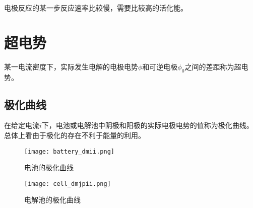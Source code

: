 电极反应的某一步反应速率比较慢，需要比较高的活化能。


\section{超电势}


某一电流密度下，实际发生电解的电极电势$\phi$和可逆电极$\phi_0$之间的差距称为超电势。

\subsection{极化曲线}


在给定电流$i$下，电池或电解池中阴极和阳极的实际电极电势的值称为极化曲线。总体上看由于极化的存在不利于能量的利用。

\begin{figure}[h]
    \centering
    \texttt{[image: battery\_dmii.png]}
    \caption{电池的极化曲线}
    \label{fig:battery_dmii}
\end{figure}

\begin{figure}[h]
    \centering
    \texttt{[image: cell\_dmjpii.png]}
    \caption{电解池的极化曲线}
    \label{fig:cell_dmjpii}
\end{figure}

